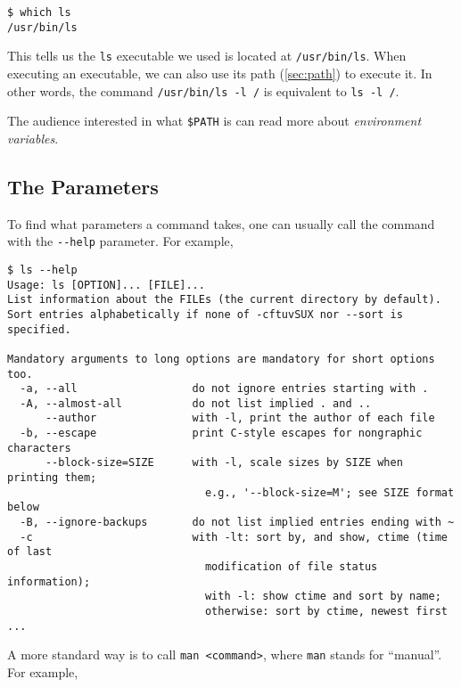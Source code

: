 \documentclass[12pt,letterpaper]{article}
\begin{document}
\begin{verbatim}
$ which ls
/usr/bin/ls
\end{verbatim}

This tells us the \texttt{ls} executable we used is located at \texttt{/usr/bin/ls}. When executing an executable, we can also use its path (\cref*{sec:path}) to execute it. In other words, the command \texttt{/usr/bin/ls -l /} is equivalent to \texttt{ls -l /}.

The audience interested in what \texttt{\$PATH} is can read more about \textit{environment variables}.

\subsection{The Parameters} \label{sec:parameters}

To find what parameters a command takes, one can usually call the command with the \texttt{-{}-help} parameter. For example,

\begin{verbatim}
$ ls --help
Usage: ls [OPTION]... [FILE]...
List information about the FILEs (the current directory by default).
Sort entries alphabetically if none of -cftuvSUX nor --sort is specified.

Mandatory arguments to long options are mandatory for short options too.
  -a, --all                  do not ignore entries starting with .
  -A, --almost-all           do not list implied . and ..
      --author               with -l, print the author of each file
  -b, --escape               print C-style escapes for nongraphic characters
      --block-size=SIZE      with -l, scale sizes by SIZE when printing them;
                               e.g., '--block-size=M'; see SIZE format below
  -B, --ignore-backups       do not list implied entries ending with ~
  -c                         with -lt: sort by, and show, ctime (time of last
                               modification of file status information);
                               with -l: show ctime and sort by name;
                               otherwise: sort by ctime, newest first
...
\end{verbatim}

A more standard way is to call \texttt{man <command>}, where \texttt{man} stands for ``manual''. For example,
\end{document}

